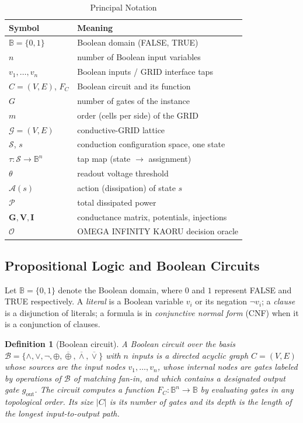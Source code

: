 \documentclass[letterpaper,journal]{IEEEtran}
\newtheorem{definition}{Definition}
\begin{document}
\begin{table}[!t]
\centering
\caption{Principal Notation}
\label{tab:notation}
\begin{tabular}{ll}
\toprule
\textbf{Symbol} & \textbf{Meaning} \\
\midrule
$\mathbb{B}=\{0,1\}$ & Boolean domain (FALSE, TRUE) \\
$n$ & number of Boolean input variables \\
$v_1,\dots,v_n$ & Boolean inputs / GRID interface taps \\
$C=(V,E)$, $F_C$ & Boolean circuit and its function \\
$G$ & number of gates of the instance \\
$m$ & order (cells per side) of the GRID \\
$\mathcal{G}=(V,E)$ & conductive-GRID lattice \\
$\mathcal{S}$, $s$ & conduction configuration space, one state \\
$\tau:\mathcal{S}\to\mathbb{B}^{n}$ & tap map (state $\to$ assignment) \\
$\theta$ & readout voltage threshold \\
$\mathcal{A}(s)$ & action (dissipation) of state $s$ \\
$\mathcal{P}$ & total dissipated power \\
$\mathbf{G},\mathbf{V},\mathbf{I}$ & conductance matrix, potentials, injections \\
$\mathcal{O}$ & OMEGA INFINITY KAORU decision oracle \\
\bottomrule
\end{tabular}
\end{table}

\subsection{Propositional Logic and Boolean Circuits}

Let $\mathbb{B}=\{0,1\}$ denote the Boolean domain, where $0$ and $1$
represent FALSE and TRUE respectively. A \emph{literal} is a Boolean
variable $v_i$ or its negation $\lnot v_i$; a \emph{clause} is a
disjunction of literals; a formula is in \emph{conjunctive normal form}
(CNF) when it is a conjunction of clauses.

\begin{definition}[Boolean circuit]
A \emph{Boolean circuit} over the basis
$\mathcal{B}=\{\land,\lor,\lnot,\oplus,\overline{\oplus},\overline{\land},\overline{\lor}\}$
with $n$ inputs is a directed acyclic graph $C=(V,E)$ whose sources are the
input nodes $v_1,\dots,v_n$, whose internal nodes are gates labeled by
operations of $\mathcal{B}$ of matching fan-in, and which contains a
designated output gate $g_{\mathrm{out}}$. The circuit computes a function
$F_C:\mathbb{B}^{n}\to\mathbb{B}$ by evaluating gates in any topological
order. Its \emph{size} $\lvert C\rvert$ is its number of gates and its
\emph{depth} is the length of the longest input-to-output path.
\end{definition}
\end{document}
